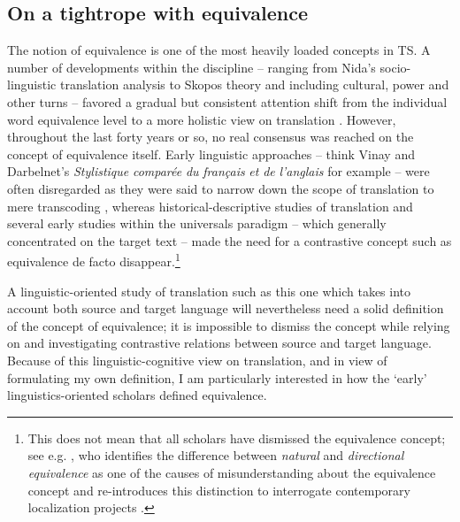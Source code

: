 \subsection{On a tightrope with equivalence}
\label{sec:2.2.4}  
The notion of equivalence is one of the most heavily loaded concepts in TS. A number of developments within the discipline – ranging from Nida’s socio-linguistic translation analysis \citep{nida_toward_1964,nida_theory_1969} to Skopos theory \citep{nord_translating_1997} and including cultural, power and other turns – favored a gradual but consistent attention shift from the individual word equivalence level to a more holistic view on translation \citep[10]{munday_issues_2009}. However, throughout the last forty years or so, no real consensus was reached on the concept of equivalence itself. Early linguistic approaches – think Vinay and Darbelnet’s \textit{Stylistique} \textit{comparée} \textit{du} \textit{français} \textit{et} \textit{de} \textit{l’anglais} \citep{vinay_stylistique_1958} for example – were often disregarded as they were said to narrow down the scope of translation to mere transcoding \citep[1]{vandeweghe_introduction:_2007}, whereas historical-descriptive studies of translation and several early studies within the universals paradigm – which generally concentrated on the target text – made the need for a contrastive concept such as equivalence de facto disappear.\footnote{This does not mean that all scholars have dismissed the equivalence concept; see e.g. \citet{pym_natural_2007}, who identifies the difference between \textit{natural} and \textit{directional equivalence} as one of the causes of misunderstanding about the equivalence concept and re-introduces this distinction to interrogate contemporary localization projects \citep[271]{pym_natural_2007}.}

A linguistic-oriented study of translation such as this one which takes into account both source and target language will nevertheless need a solid definition of the concept of equivalence; it is impossible to dismiss the concept while relying on and investigating contrastive relations between source and target language. Because of this linguistic-cognitive view on translation, and in view of formulating my own definition, I am particularly interested in how the ‘early’ linguistics-oriented scholars defined equivalence.

